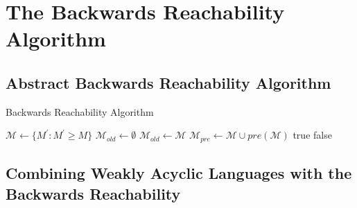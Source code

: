 \chapter{The Backwards Reachability Algorithm}\label{chapter:coverability}


\section{Abstract Backwards Reachability Algorithm}

\begin{algorithm}
\caption{Backwards Reachability Algorithm}\label{alg:bw}
\begin{algorithmic}
\State $\mathcal{M} \gets \{ M^{'} : M^{'} \ge M \}$
\State $\mathcal{M}_{old} \gets \emptyset$
	\State $\mathcal{M}_{old} \gets \mathcal{M}$
	\State $\mathcal{M}_{pre} \gets \mathcal{M} \cup pre(\mathcal{M})$
	\Return true
\EndIf
{}
    \Return false
\EndIf
\EndWhile
\end{algorithmic}
\end{algorithm}



\section{Combining Weakly Acyclic Languages with the Backwards Reachability}
